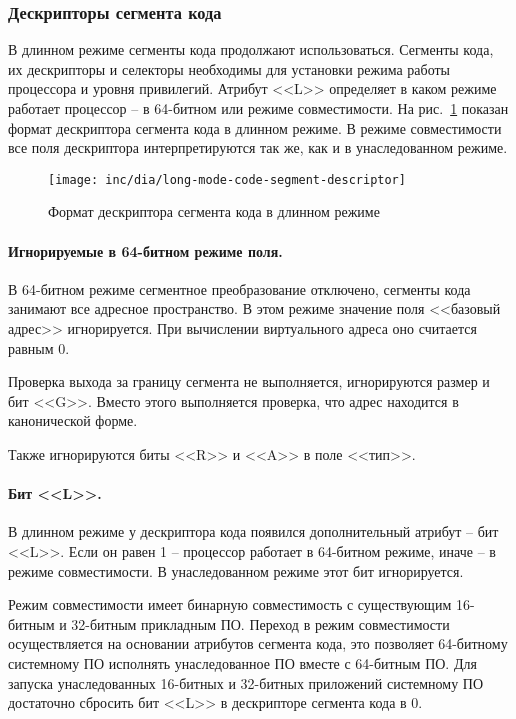 \subsubsection*{Дескрипторы сегмента кода}
В длинном режиме сегменты кода продолжают использоваться. Сегменты кода, их дескрипторы и селекторы
необходимы для установки режима работы процессора и уровня привилегий. Атрибут <<L>> определяет в
каком режиме работает процессор -- в 64-битном или режиме совместимости.
На рис.~\ref{fig:long-mode-code-segment-descriptor-format} показан формат дескриптора сегмента кода
в длинном режиме. В режиме совместимости все поля дескриптора интерпретируются так же, как и в унаследованном режиме.

\begin{figure}[ht!]
  \centering
  \texttt{[image: inc/dia/long-mode-code-segment-descriptor]}
  \caption{Формат дескриптора сегмента кода в длинном режиме}
  \label{fig:long-mode-code-segment-descriptor-format}
\end{figure}

\paragraph{Игнорируемые в 64-битном режиме поля.}
В 64-битном режиме сегментное преобразование отключено, сегменты кода занимают все адресное пространство.
В этом режиме значение поля <<базовый адрес>> игнорируется. При вычислении виртуального адреса оно считается равным 0.

Проверка выхода за границу сегмента не выполняется, игнорируются размер и бит <<G>>. Вместо этого выполняется
проверка, что адрес находится в канонической форме.

Также игнорируются биты <<R>> и <<A>> в поле <<тип>>.

\paragraph{Бит <<L>>.} В длинном режиме у дескриптора кода появился дополнительный атрибут -- бит <<L>>. Если он равен 1 --
процессор работает в 64-битном режиме, иначе -- в режиме совместимости. В унаследованном режиме этот бит игнорируется.

Режим совместимости имеет бинарную совместимость с существующим 16-битным и 32-битным прикладным ПО.
Переход в режим совместимости осуществляется на основании атрибутов сегмента кода, это позволяет
64-битному системному ПО исполнять унаследованное ПО вместе с 64-битным ПО. Для запуска унаследованных
16-битных и 32-битных приложений системному ПО достаточно сбросить бит <<L>> в дескрипторе сегмента кода в 0.

